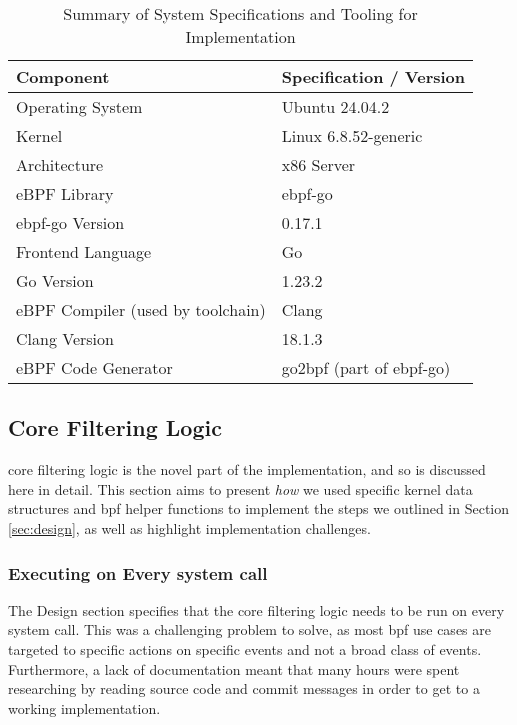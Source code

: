 \begin{table}[h]
\centering
\caption{Summary of System Specifications and Tooling for \af Implementation}
\label{tab:specs_tooling}
\begin{tabular}{ll}
\toprule %
\textbf{Component} & \textbf{Specification / Version} \\
\midrule %
Operating System      & Ubuntu 24.04.2 \\
Kernel                & Linux 6.8.52-generic \\
Architecture          & x86 Server \\
eBPF Library          & ebpf-go \\
ebpf-go Version       & 0.17.1 \\
Frontend Language     & Go \\
Go Version            & 1.23.2 \\
eBPF Compiler (used by toolchain) & Clang \\
Clang Version         & 18.1.3 \\
eBPF Code Generator   & go2bpf (part of ebpf-go) \\
\bottomrule %
\end{tabular}
\end{table}

\subsection{Core Filtering Logic}

\afg core filtering logic is the novel part of the implementation, and so is
discussed here in detail. This section aims to present \textit{how} we used
specific kernel data structures and \ac{bpf} helper functions to implement the
steps we outlined in Section \ref{sec:design}, as well as highlight
implementation challenges.

\subsubsection{Executing on Every system call}

The Design section specifies that the core filtering logic needs to be run on
every system call. This was a challenging problem to solve, as most \ac{bpf}
use cases are targeted to specific actions on specific events and not a broad
class of events. Furthermore, a lack of documentation meant that many hours were
spent researching by reading source code and commit messages in order to get to
a working implementation.

